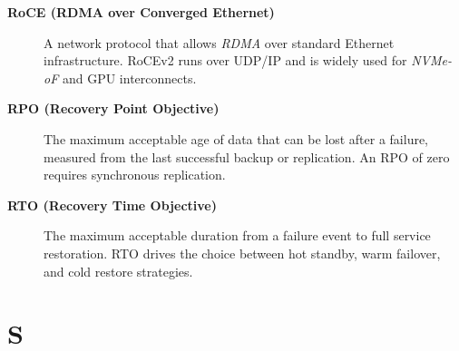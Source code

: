 \begin{description}
\item[\textbf{RoCE (RDMA over Converged Ethernet)}]
A network protocol that allows \textit{RDMA} over standard Ethernet
infrastructure. RoCEv2 runs over UDP/IP and is widely used for
\textit{NVMe-oF} and GPU interconnects.

\item[\textbf{RPO (Recovery Point Objective)}]
The maximum acceptable age of data that can be lost after a failure,
measured from the last successful backup or replication. An RPO of zero
requires synchronous replication.

\item[\textbf{RTO (Recovery Time Objective)}]
The maximum acceptable duration from a failure event to full service
restoration. RTO drives the choice between hot standby, warm failover,
and cold restore strategies.

\end{description}

\section*{S}

